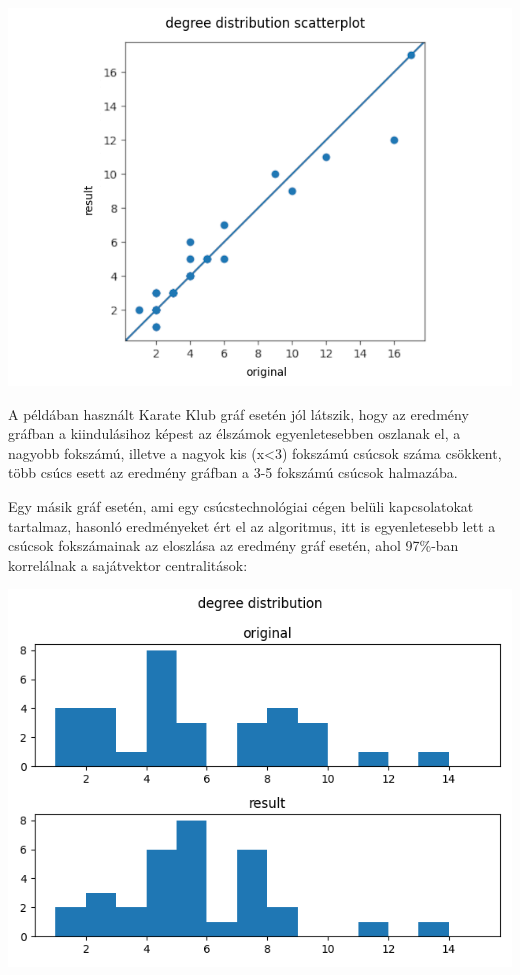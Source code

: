 \documentclass[12pt,numbers=noenddot]{report}
\begin{document}
\includegraphics[width=0.95\linewidth]{images/find_similar_scatterplot.png}


A példában használt Karate Klub gráf esetén jól látszik, hogy az eredmény 
gráfban a kiindulásihoz képest az élszámok egyenletesebben oszlanak el, a 
nagyobb fokszámú, illetve a nagyok kis (x<3) fokszámú csúcsok száma csökkent,
több csúcs esett az eredmény gráfban a 3-5 fokszámú csúcsok halmazába.


Egy másik gráf esetén, ami egy csúcstechnológiai cégen belüli kapcsolatokat 
tartalmaz, hasonló eredményeket ért el az algoritmus, itt is egyenletesebb lett 
a csúcsok fokszámainak az eloszlása az eredmény gráf esetén, ahol 97\%-ban 
korrelálnak a sajátvektor centralitások:

\hspace{1cm}

\includegraphics[width=0.8\linewidth]{images/find_similar_histogram2.png}
\end{document}
